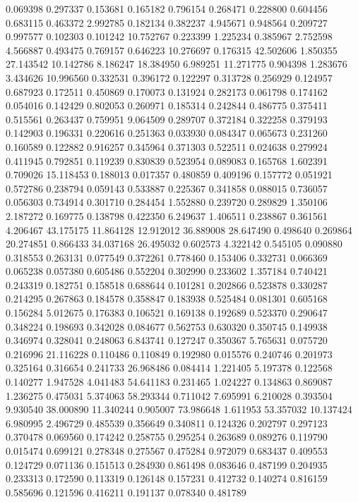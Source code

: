 0.069398
0.297337
0.153681
0.165182
0.796154
0.268471
0.228800
0.604456
0.683115
0.463372
2.992785
0.182134
0.382237
4.945671
0.948564
0.209727
0.997577
0.102303
0.101242
10.752767
0.223399
1.225234
0.385967
2.752598
4.566887
0.493475
0.769157
0.646223
10.276697
0.176315
42.502606
1.850355
27.143542
10.142786
8.186247
18.384950
6.989251
11.271775
0.904398
1.283676
3.434626
10.996560
0.332531
0.396172
0.122297
0.313728
0.256929
0.124957
0.687923
0.172511
0.450869
0.170073
0.131924
0.282173
0.061798
0.174162
0.054016
0.142429
0.802053
0.260971
0.185314
0.242844
0.486775
0.375411
0.515561
0.263437
0.759951
9.064509
0.289707
0.372184
0.322258
0.379193
0.142903
0.196331
0.220616
0.251363
0.033930
0.084347
0.065673
0.231260
0.160589
0.122882
0.916257
0.345964
0.371303
0.522511
0.024638
0.279924
0.411945
0.792851
0.119239
0.830839
0.523954
0.089083
0.165768
1.602391
0.709026
15.118453
0.188013
0.017357
0.480859
0.409196
0.157772
0.051921
0.572786
0.238794
0.059143
0.533887
0.225367
0.341858
0.088015
0.736057
0.056303
0.734914
0.301710
0.284454
1.552880
0.239720
0.289829
1.350106
2.187272
0.169775
0.138798
0.422350
6.249637
1.406511
0.238867
0.361561
4.206467
43.175175
11.864128
12.912012
36.889008
28.647490
0.498640
0.269864
20.274851
0.866433
34.037168
26.495032
0.602573
4.322142
0.545105
0.090880
0.318553
0.263131
0.077549
0.372261
0.778460
0.153406
0.332731
0.066369
0.065238
0.057380
0.605486
0.552204
0.302990
0.233602
1.357184
0.740421
0.243319
0.182751
0.158518
0.688644
0.101281
0.202866
0.523878
0.330287
0.214295
0.267863
0.184578
0.358847
0.183938
0.525484
0.081301
0.605168
0.156284
5.012675
0.176383
0.106521
0.169138
0.192689
0.523370
0.290647
0.348224
0.198693
0.342028
0.084677
0.562753
0.630320
0.350745
0.149938
0.346974
0.328041
0.248063
6.843741
0.127247
0.350367
5.765631
0.075720
0.216996
21.116228
0.110486
0.110849
0.192980
0.015576
0.240746
0.201973
0.325164
0.316654
0.241733
26.968486
0.084414
1.221405
5.197378
0.122568
0.140277
1.947528
4.041483
54.641183
0.231465
1.024227
0.134863
0.869087
1.236275
0.475031
5.374063
58.293344
0.711042
7.695991
6.210028
0.393504
9.930540
38.000890
11.340244
0.905007
73.986648
1.611953
53.357032
10.137424
6.980995
2.496729
0.485539
0.356649
0.340811
0.124326
0.202797
0.297123
0.370478
0.069560
0.174242
0.258755
0.295254
0.263689
0.089276
0.119790
0.015474
0.699121
0.278348
0.275567
0.475284
0.972079
0.683437
0.409553
0.124729
0.071136
0.151513
0.284930
0.861498
0.083646
0.487199
0.204935
0.233313
0.172590
0.113319
0.126148
0.157231
0.412732
0.140274
0.816159
0.585696
0.121596
0.416211
0.191137
0.078340
0.481789
